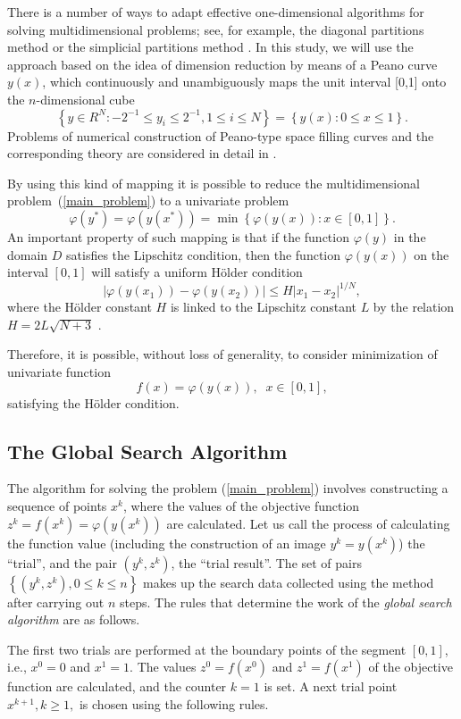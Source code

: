 \documentclass[sensors,article,submit,moreauthors,pdftex]{Definitions/mdpi}
\begin{document}
There is a number of ways to adapt effective one-dimensional algorithms for solving multidimensional problems; see, for example, the diagonal partitions method \cite{Sergeyev2017} or the simplicial partitions method \cite{Zilinskas2014}. In this study, we will use the approach based on the idea of dimension reduction by means of a Peano curve $y(x)$, which continuously and unambiguously maps the unit interval [0,1] onto the $n$-dimensional cube
\[
\left\{y\in R^N: -2^{-1}\leq y_i \leq 2^{-1}, 1 \leq i \leq N\right\}=\left\{y(x):0\leq x \leq 1 \right\}.
\]
Problems of numerical construction of Peano-type space filling curves and the corresponding theory are considered in detail in \cite{Strongin2000,Sergeyev2013}.

By using this kind of mapping it is possible to reduce the multidimensional problem~(\ref{main_problem}) to a univariate problem
\[
\varphi(y^\ast)=\varphi(y(x^\ast))=\min{\left\{\varphi(y(x)): x\in[0,1]\right\}}.
\]
An important property of such mapping is that if the function $\varphi(y)$ in the domain $D$ satisfies the Lipschitz condition, then the function $\varphi(y(x))$ on the interval $[0,1]$ will satisfy a uniform H{\"o}lder condition
\[
\left|\varphi(y(x_1))-\varphi(y(x_2))\right|\leq H\left|x_1-x_2\right|^{1/N},
\]
where the H{\"o}lder constant $H$ is linked to the Lipschitz constant $L$ by the relation $H=2L\sqrt{N+3}$ \cite{Strongin2000}.

Therefore, it is possible, without loss of generality, to consider minimization of univariate function
\[
f(x)=\varphi(y(x)), \;\; x\in[0,1],
\]
satisfying the H{\"o}lder condition.


\subsection{The Global Search Algorithm}\label{GSA}

The algorithm for solving the problem (\ref{main_problem}) involves constructing a sequence of points $x^k$, where the values of the objective function $z^k = f(x^k)=\varphi(y(x^k))$ are calculated. Let us call the process of calculating the function value (including the construction of an image $y^k=y(x^k)$) the ``trial'', and the pair $(y^k, z^k)$, the ``trial result''. The set of pairs $\left\{(y^k, z^k), 0\leq k\leq n\right\}$ makes up the search data collected using the method after carrying out $n$ steps. The rules that determine the work of the \textit{global search algorithm} are as follows.

The first two trials are performed at the boundary points of the segment $[0,1]$, i.e., $x^0 = 0$ and $x^1 = 1$. The values $z^0 = f(x^0)$ and $z^1 = f(x^1)$ of the objective function are calculated, and the counter $k = 1$ is set. A next trial point $x^{k+1}, k \geq 1,$ is chosen using the following rules.
\end{document}
